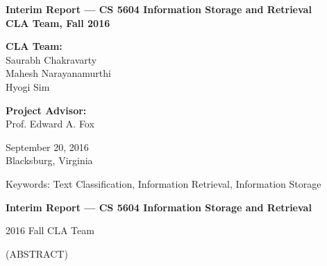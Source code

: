 \documentclass[12pt]{report}
\begin{document}
\thispagestyle{empty}
\begin{center}

{\Large 
\bf{Interim Report --- CS 5604 Information Storage and Retrieval}\\\vspace{.1in}
\bf{\smaller CLA Team, Fall 2016}
}

\vfill


\vfill


\vfill

{\bf CLA Team:}\\\vspace{.05in}
Saurabh Chakravarty\\
Mahesh Narayanamurthi\\
Hyogi Sim\\

\vfill

{\bf Project Advisor:}\\\vspace{.05in}
Prof. Edward A. Fox

\vfill

September 20, 2016 \\
Blacksburg, Virginia

\vfill

Keywords: Text Classification, Information Retrieval, Information Storage

\end{center}

\pagebreak

\thispagestyle{empty}
\begin{center}

{\large
\bf{Interim Report --- CS 5604 Information Storage and Retrieval}
}

\vfill

{2016 Fall CLA Team}

\vfill

(ABSTRACT)

\vfill

\end{center}
\end{document}
